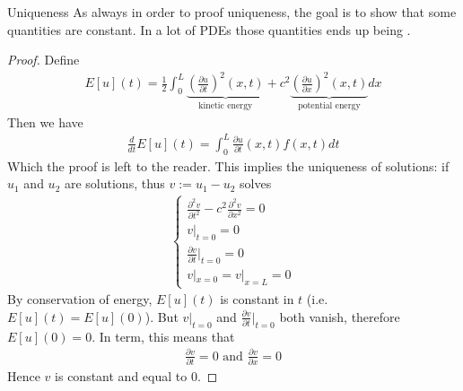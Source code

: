 \begin{parag}{Uniqueness}
	As always in order to proof uniqueness, the goal is to show that some quantities are constant. In a lot of PDEs those quantities ends up being .
    \begin{proof}
		Define 
		\begin{align*} 
			E\left[u\right]\left(t\right) = \frac{1}{2}\int_{0}^{L}\underbrace{\left(\frac{\partial u}{\partial t} \right)^2 \left(x, t\right)}_{\text{kinetic energy}} + c^2 \underbrace{\left(\frac{\partial u}{\partial x} \right)^2\left(x, t\right)}_{\text{potential energy}}dx
		\end{align*}
		Then we have 
		\begin{align*} 
			\frac{d}{dt} E\left[u\right]\left(t\right) = \int_{0}^{L}\frac{\partial u}{\partial t} \left(x, t\right) f\left(x, t\right)dt
		\end{align*}
		Which the proof is left to the reader. This implies the uniqueness of solutions: if $u_1$ and $u_2$ are solutions, thus $v:= u_1 - u_2$ solves 
		\begin{align*} 
			\begin{cases}
				\frac{\partial^2 v}{\partial t^2} - c^2 \frac{\partial^2 v}{\partial x^2} = 0\\
				v|_{t= 0}= 0\\
				\frac{\partial v}{\partial t} |_{t= 0} = 0\\
				v|_{x= 0} = v|_{x = L}= 0
			\end{cases} 
		\end{align*}
		By conservation of energy, $E\left[u\right]\left(t\right)$ is constant in $t$ (i.e. $E\left[u\right]\left(t\right)= E\left[u\right]\left(0\right)$). But $v|_{t= 0}$ and $\frac{\partial v}{\partial t} |_{t= 0}$ both vanish, therefore $E\left[u\right]\left(0\right)= 0$. In term, this means that 
		\begin{align*} 
			\frac{\partial v}{\partial t} = 0 \text{ and } \frac{\partial v}{\partial x} = 0
		\end{align*}
		Hence $v$ is constant and equal to $0$.
    \end{proof}
    
\end{parag}


